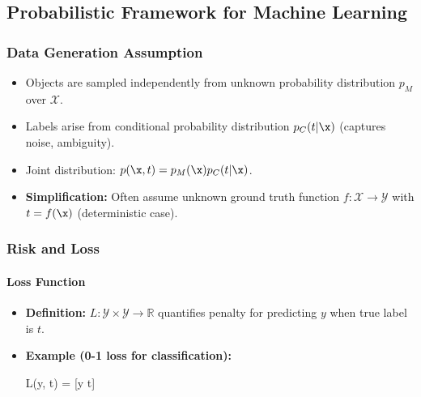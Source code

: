 \begin{itemize}
\begin{center}
    \end{center}
\end{itemize}

\subsection*{Probabilistic Framework for Machine Learning}

\subsubsection*{Data Generation Assumption}
\begin{itemize}
    \item Objects are sampled independently from unknown probability distribution $p_M$ over $\mathcal{X}$.
    \item Labels arise from conditional probability distribution $p_C(t|\x)$ (captures noise, ambiguity).
    \item Joint distribution: $p(\x, t) = p_M(\x) p_C(t|\x)$.
    \item \textbf{Simplification:} Often assume unknown ground truth function $f: \mathcal{X} \to \mathcal{Y}$ with $t = f(\x)$ (deterministic case).
\end{itemize}

\subsubsection*{Risk and Loss}

\paragraph{Loss Function}
\begin{itemize}
    \item \textbf{Definition:} $L: \mathcal{Y} \times \mathcal{Y} \to \mathbb{R}$ quantifies penalty for predicting $y$ when true label is $t$.
    \item \textbf{Example (0-1 loss for classification):}
    \begin{myequation}\color{evidmath}
    L(y, t) = [y \neq t]
    \end{myequation}
\end{itemize}


